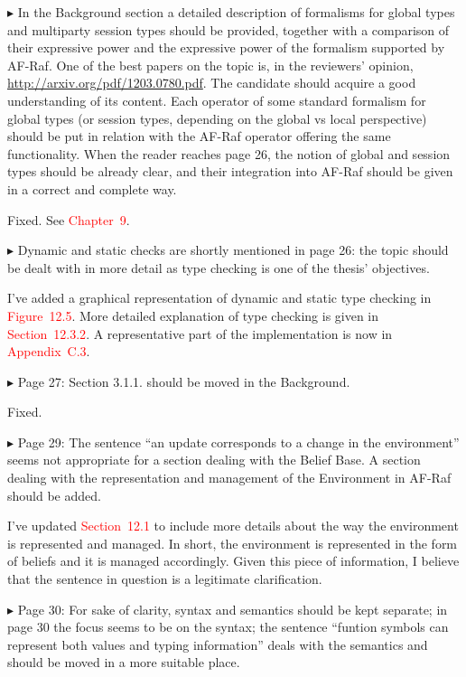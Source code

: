 \documentclass{article}
\newcommand*\R[1]{\textcolor{red}{#1}} %
\newenvironment{them}%
  {\bigskip\noindent\begingroup\color{blue}$\blacktriangleright$\enspace}%
  {\endgroup\par}
\begin{document}
\begin{them}
In the Background section a detailed description of formalisms for global types
and multiparty session types should be provided, together with a comparison of
their expressive power and the expressive power of the formalism supported by
AF-Raf. One of the best papers on the topic is, in the reviewers' opinion,
\url{http://arxiv.org/pdf/1203.0780.pdf}. The candidate should acquire a good
understanding of its content. Each operator of some standard formalism for
global types (or session types, depending on the global vs local perspective)
should be put in relation with the AF-Raf operator offering the same
functionality. When the reader reaches page 26, the notion of global and
session types should be already clear, and their integration into AF-Raf should
be given in a correct and complete way.
\end{them}
Fixed. See \R{Chapter~9}.

\begin{them}
Dynamic and static checks are shortly mentioned in page 26: the topic should be
dealt with in more detail as type checking is one of the thesis' objectives.
\end{them}
I've added a graphical representation of dynamic and static type checking
in \R{Figure~12.5}. More detailed explanation of type checking is given
in \R{Section~12.3.2}. A representative part of the implementation is now
in \R{Appendix~C.3}.

\begin{them}
Page 27:
Section 3.1.1. should be moved in the Background.
\end{them}
Fixed. 

\begin{them}
Page 29:
The sentence ``an update corresponds to a change in the environment'' seems not
appropriate for a section dealing with the Belief Base. A section dealing with
the representation and management of the Environment in AF-Raf should be added.
\end{them}
I've updated \R{Section~12.1} to include more details about the way the
environment is represented and managed. In short, the environment is
represented in the form of beliefs and it is managed accordingly. Given this
piece of information, I believe that the sentence in question is a legitimate
clarification.

\begin{them}
Page 30:
For sake of clarity, syntax and semantics should be kept separate; in page 30
the focus seems to be on the syntax; the sentence ``funtion symbols can
represent both values and typing information'' deals with the semantics and
should be moved in a more suitable place.
\end{them}
\end{document}
